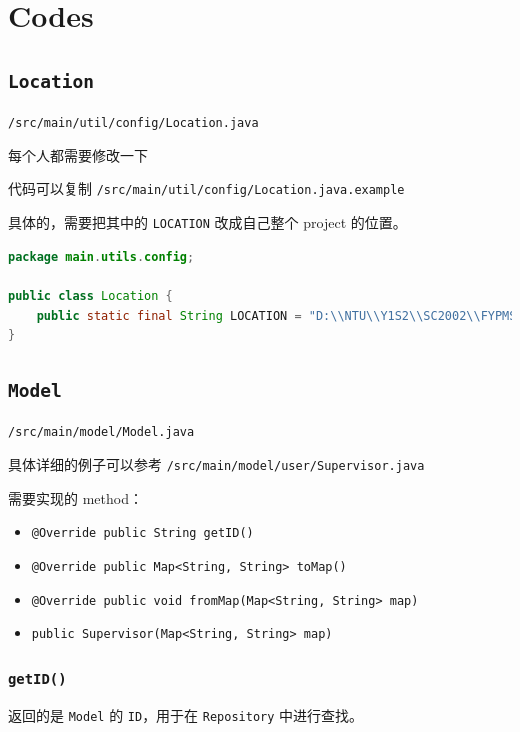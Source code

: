 \documentclass[hyperref,UTF8,12pt,a4paper]{ctexart}
\begin{document}
\section{Codes}

\subsection{\texttt{Location}}

\texttt{/src/main/util/config/Location.java}

每个人都需要修改一下

代码可以复制 \texttt{/src/main/util/config/Location.java.example}

具体的，需要把其中的 \texttt{LOCATION} 改成自己整个 project 的位置。

\begin{lstlisting}[language=Java]
package main.utils.config;

public class Location {
    public static final String LOCATION = "D:\\NTU\\Y1S2\\SC2002\\FYPMS";
}
\end{lstlisting}

\subsection{\texttt{Model}}

\texttt{/src/main/model/Model.java}

具体详细的例子可以参考 \texttt{/src/main/model/user/Supervisor.java}

需要实现的 method：

\begin{itemize}
	\item \texttt{@Override public String getID()}
	\item \texttt{@Override public Map<String, String> toMap()}
	\item \texttt{@Override public void fromMap(Map<String, String> map)}
	\item \texttt{public Supervisor(Map<String, String> map)}
\end{itemize}

\subsubsection{\texttt{getID()}}

返回的是 \texttt{Model} 的 \texttt{ID}，用于在 \texttt{Repository} 中进行查找。
\end{document}

